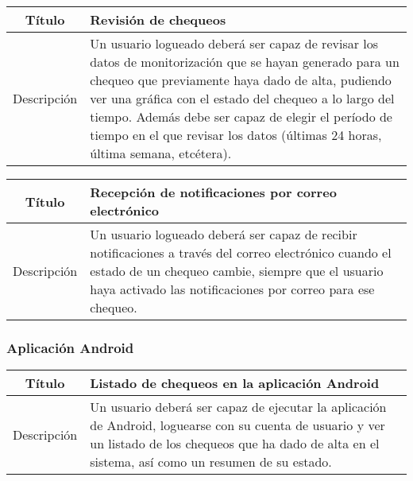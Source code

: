 \begin{center}
  
  \begin{tabularx}{\textwidth}{|c|X|}
    \hline
    Título & Revisión de chequeos \\

    \hline

    Descripción & Un usuario logueado deberá ser capaz de revisar los datos de
    monitorización que se hayan generado para un chequeo que previamente haya
    dado de alta, pudiendo ver una gráfica con el estado del chequeo a lo largo
    del tiempo. Además debe ser capaz de elegir el período de tiempo en el que
    revisar los datos (últimas 24 horas, última semana, etcétera). \\

    \hline
  \end{tabularx}
\end{center}


\begin{center}
  
  \begin{tabularx}{\textwidth}{|c|X|}
    \hline
    Título & Recepción de notificaciones por correo electrónico \\

    \hline

    Descripción & Un usuario logueado deberá ser capaz de recibir notificaciones
    a través del correo electrónico cuando el estado de un chequeo cambie,
    siempre que el usuario haya activado las notificaciones por correo para ese
    chequeo. \\

    \hline
  \end{tabularx}
\end{center}

\FloatBarrier
\subsubsection{Aplicación Android}


\begin{center}
  
  \begin{tabularx}{\textwidth}{|c|X|}
    \hline
    Título & Listado de chequeos en la aplicación Android \\

    \hline

    Descripción & Un usuario deberá ser capaz de ejecutar la aplicación de
    Android, loguearse con su cuenta de usuario y ver un listado de los chequeos
    que ha dado de alta en el sistema, así como un resumen de su estado.
    \\

    \hline
  \end{tabularx}
\end{center}


